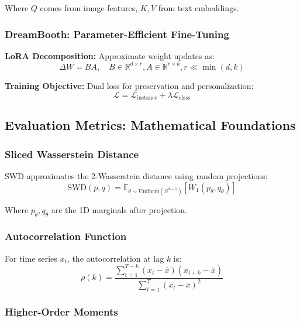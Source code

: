 \documentclass[a4paper,12pt]{article}
\begin{document}
Where $Q$ comes from image features, $K, V$ from text embeddings.

\subsubsection{DreamBooth: Parameter-Efficient Fine-Tuning}

\textbf{LoRA Decomposition:} Approximate weight updates as:
\begin{equation}
\Delta W = BA, \quad B \in \mathbb{R}^{d \times r}, A \in \mathbb{R}^{r \times k}, r \ll \min(d, k)
\label{eq:lora_decomposition}
\end{equation}

\textbf{Training Objective:} Dual loss for preservation and personalization:
\begin{equation}
\mathcal{L} = \mathcal{L}_{\text{instance}} + \lambda \mathcal{L}_{\text{class}}
\label{eq:dreambooth_loss}
\end{equation}

\subsection{Evaluation Metrics: Mathematical Foundations}

\subsubsection{Sliced Wasserstein Distance}

SWD approximates the 2-Wasserstein distance using random projections:
\begin{equation}
\text{SWD}(p, q) = \mathbb{E}_{\theta \sim \text{Uniform}(S^{d-1})} [W_1(p_\theta, q_\theta)]
\label{eq:swd_definition}
\end{equation}

Where $p_\theta, q_\theta$ are the 1D marginals after projection.

\subsubsection{Autocorrelation Function}

For time series $x_t$, the autocorrelation at lag $k$ is:
\begin{equation}
\rho(k) = \frac{\sum_{t=1}^{T-k} (x_t - \bar{x})(x_{t+k} - \bar{x})}{\sum_{t=1}^T (x_t - \bar{x})^2}
\label{eq:autocorrelation}
\end{equation}

\subsubsection{Higher-Order Moments}
\end{document}
